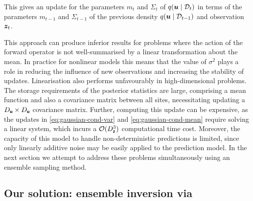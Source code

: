\documentclass{article}
\theoremstyle{plain}
\theoremstyle{definition}
\theoremstyle{remark}
\begin{document}
This gives an update for the parameters $m_t$ and $\Sigma_t$ of $q(\boldsymbol{u} \mid \mathcal{D}_t)$ in terms of the parameters $m_{t-1}$ and $\Sigma_{t-1}$ of the previous density $q(\boldsymbol{u} \mid \mathcal{D}_{t-1})$ and observation $\boldsymbol{z}_t$.

This approach can produce inferior results for problems where the action of the forward operator is not well-summarised by a linear transformation about the mean.
In practice for nonlinear models this means that the value of \(\sigma^2\) plays a role in reducing the influence of new observations and increasing the stability of updates.
Linearisation also performs unfavourably in high-dimensional problems.
The storage requirements of the  posterior statistics are large, comprising a mean function and also a covariance matrix between all sites, necessitating updating a \(D_{\boldsymbol{\mathsf{u}}}\times D_{\boldsymbol{\mathsf{u}}}\) covariance matrix.
Further, computing this update can be  expensive, as the updates in \eqref{eq:gaussian-cond-var} and \eqref{eq:gaussian-cond-mean} require solving a linear system, which incurs a \(\mathcal{O}(D_{\boldsymbol{\mathsf{\boldsymbol{\mathsf{z}}}}}^3)\) computational time cost.
Moreover, the capacity of this model to handle non-deterministic predictions is limited, since only linearly additive noise may be easily applied to the prediction model.
In the next section we attempt to address these problems simultaneously using an ensemble sampling method.

\subsection{Our solution: ensemble inversion via \meth{}}\label{sec:EnsembleInversion}
\end{document}
